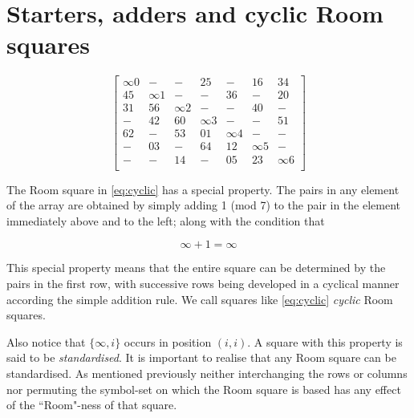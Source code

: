\documentclass[
  11pt,
  a4paper]{book}
\begin{document}
\hypertarget{starters-adders-and-cyclic-room-squares}{%
\section{Starters, adders and cyclic Room squares}\label{starters-adders-and-cyclic-room-squares}}

\begin{equation}
  \begin{bmatrix}
    \infty 0 &     -    &     -    &     25     &     -    &     16     &    34    \\
      45     & \infty 1 &     -    &      -     &    36    &      -     &    20    \\
      31     &    56    & \infty 2 &      -     &     -    &     40     &     -    \\
       -     &    42    &    60    &  \infty 3  &     -    &      -     &    51    \\
      62     &     -    &    53    &     01     & \infty 4 &      -     &     -    \\
       -     &    03    &     -    &     64     &    12    &  \infty 5  &     -    \\
       -     &     -    &    14    &      -     &    05    &     23     & \infty 6 \\
  \end{bmatrix}
  \label{eq:cyclic}
\end{equation}

The Room square in \eqref{eq:cyclic} has a
special property. The pairs in any element of the array are
obtained by simply adding 1 (mod 7) to the pair in the
element immediately above and to the left; along with the
condition that

\begin{equation}
  \infty + 1 = \infty
\end{equation}

This special property means that the entire square can be
determined by the pairs in the first row, with successive
rows being developed in a cyclical manner according the
simple addition rule. We call squares like \eqref{eq:cyclic}
\emph{cyclic} Room squares.

Also notice that \(\{\infty,i\}\) occurs in position \((i,i)\).
A square with this property is said to be \emph{standardised}. It
is important to realise that any Room square can be
standardised. As mentioned previously neither interchanging
the rows or columns nor permuting the symbol-set on which
the Room square is based has any effect of the
``Room"-ness of that square.
\end{document}
